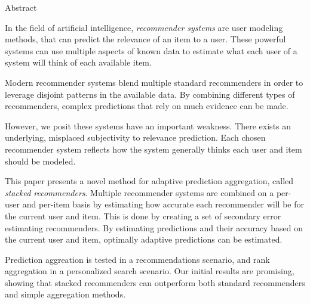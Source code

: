 \null\vspace{4em}
{
  \centering
  \normalfont
  \huge
  Abstract\\
}
\vspace{2em}

In the field of artificial intelligence,
\emph{recommender systems} are user modeling methods,
that can predict the relevance of an item to a user.
These powerful systems can use multiple aspects of known data
to estimate what each user of a system will think of each available item.

Modern recommender systems blend multiple standard recommenders
in order to leverage disjoint patterns in the available data.
By combining different types of recommenders,
complex predictions that rely on much evidence can be made.

However, we posit these systems have an important weakness.
There exists an underlying, misplaced subjectivity to relevance prediction.
Each chosen recommender system reflects how the system
generally thinks each user and item should be modeled.

This paper presents a novel method for adaptive prediction aggregation,
called \emph{stacked recommenders}.
Multiple recommender systems are combined on a per-user and per-item basis
by estimating how accurate each recommender will be for the current user and item.
This is done by creating a set of secondary error estimating recommenders.
By estimating predictions and their accuracy based 
on the current user and item,
optimally adaptive predictions can be estimated.

Prediction aggreation is tested in a recommendations scenario,
and rank aggregation in a personalized search scenario.
Our initial results are promising, showing that stacked recommenders
can outperform both standard recommenders and simple aggregation methods.

\clearpage
